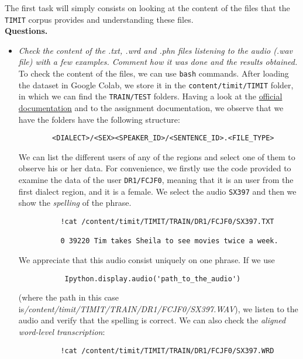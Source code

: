 \documentclass[a4paper]{article}
\def\inline{\lstinline[basicstyle=\ttfamily,keywordstyle={}]}
\begin{document}
The first task will simply consists on looking at the content of the files that the \inline{TIMIT} corpus provides and understanding these files.\\

\textbf{Questions.}

\begin{itemize}
  \item \emph{Check the content of the .txt, .wrd and .phn files listening to the audio (.wav file) with a few examples. Comment how it was done and the results obtained.}\\

        To check the content of the files, we can use \inline{bash} commands. After loading the dataset in Google Colab, we store it in the \inline{content/timit/TIMIT} folder, in which we can find the \inline{TRAIN/TEST} folders. Having a look at the \href{https://catalog.ldc.upenn.edu/LDC93s1}{official documentation} and to the assignment documentation, we observe that we have the folders have the following structure:
        \begin{verbatim}
        <DIALECT>/<SEX><SPEAKER_ID>/<SENTENCE_ID>.<FILE_TYPE>
        \end{verbatim}

        We can list the different users of any of the regions and select one of them to observe his or her data. For convenience, we firstly use the code provided to examine the data of the user \inline{DR1/FCJF0}, meaning that it is an user from the first dialect region, and it is a female. We select the audio \inline{SX397} and then we show the \emph{spelling} of the phrase.

        \begin{verbatim}
          !cat /content/timit/TIMIT/TRAIN/DR1/FCJF0/SX397.TXT

          0 39220 Tim takes Sheila to see movies twice a week.
        \end{verbatim}

        We appreciate that this audio consist uniquely on one phrase. If we use
        \begin{verbatim}
           Ipython.display.audio('path_to_the_audio')
        \end{verbatim}
        (where the path in this case is\emph{/content/timit/TIMIT/TRAIN/DR1/FCJF0/SX397.WAV}), we listen to the audio and verify that the spelling is correct. We can also check the \emph{aligned word-level transcription}:

        \begin{verbatim}
          !cat /content/timit/TIMIT/TRAIN/DR1/FCJF0/SX397.WRD


\end{verbatim}
\end{itemize}
\end{document}
